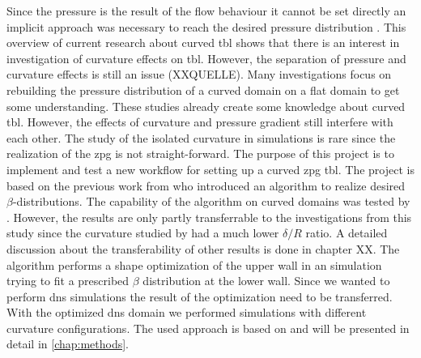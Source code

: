Since the pressure is the result of the flow behaviour it cannot be set directly an implicit approach was necessary to reach the desired pressure distribution \citep{appelbaum_systematic_2025}.
This overview of current research about curved \acrshort{tbl} shows that there is an interest in investigation of curvature effects on \acrshort{tbl}.
However, the separation of pressure and curvature effects is still an issue (XXQUELLE).
Many investigations focus on rebuilding the pressure distribution of a curved domain on a flat domain to get some understanding.
These studies already create some knowledge about curved \acrshort{tbl}.
However, the effects of curvature and pressure gradient still interfere with each other.
The study of the isolated curvature in simulations is rare since the realization of the \acrshort{zpg} is not straight-forward.
The purpose of this project is to implement and test a new workflow for setting up a curved \acrshort{zpg} \acrshort{tbl}.
The project is based on the previous work from \citet{morita_applying_2022} who introduced an algorithm to realize desired $\beta$-distributions.
The capability of the algorithm on curved domains was tested by \citet{ganagdhar_bayesian_2025}.
However, the results are only partly transferrable to the investigations from this study since the curvature studied by \citet{ganagdhar_bayesian_2025} had a much lower $\delta/R$ ratio. 
A detailed discussion about the transferability of other results is done in chapter XX.
The algorithm performs a shape optimization of the upper wall in an  simulation trying to fit a prescribed $\beta$ distribution at the lower wall.
Since we wanted to perform \acrshort{dns} simulations the result of the optimization need to be transferred.
With the optimized \acrshort{dns} domain we performed simulations with different curvature configurations.
The used approach is based on \citet{schlatter_leveraging_nodate} and will be presented in detail in \autoref{chap:methods}.



